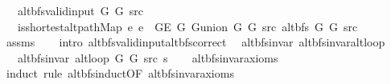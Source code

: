 \begin{isabellebody}
\ \ \ {\isachardoublequoteopen}alt{\isacharunderscore}{\kern0pt}bfs{\isacharunderscore}{\kern0pt}valid{\isacharunderscore}{\kern0pt}input{\isacharprime}{\kern0pt}\ G{}\ G{}\ src{\isachardoublequoteclose}\isanewline
\ \ \ {\isachardoublequoteopen}is{\isacharunderscore}{\kern0pt}shortest{\isacharunderscore}{\kern0pt}alt{\isacharunderscore}{\kern0pt}path{\isacharunderscore}{\kern0pt}Map\ {\isacharparenleft}{\kern0pt}{\isasymlambda}e{\isachardot}{\kern0pt}\ e\ {\isasymin}\ G{\isachardot}{\kern0pt}E\ G{}{\isacharparenright}{\kern0pt}\ {\isacharparenleft}{\kern0pt}G{\isachardot}{\kern0pt}union\ G{}\ G{}{\isacharparenright}{\kern0pt}\ src\ {\isacharparenleft}{\kern0pt}alt{\isacharunderscore}{\kern0pt}bfs\ G{}\ G{}\ src{\isacharparenright}{\kern0pt}{\isachardoublequoteclose}\isanewline
%
\isadelimproof
\ \ %
\endisadelimproof
%
\isatagproof
{}\isamarkupfalse%
\ assms\isanewline
\ \ \isamarkupfalse%
\ {\isacharparenleft}{\kern0pt}intro\ alt{\isacharunderscore}{\kern0pt}bfs{\isacharunderscore}{\kern0pt}valid{\isacharunderscore}{\kern0pt}input{\isachardot}{\kern0pt}alt{\isacharunderscore}{\kern0pt}bfs{\isacharunderscore}{\kern0pt}correct{\isacharparenright}{\kern0pt}%
\endisatagproof
{\isafoldproof}%
%
\isadelimproof
\isanewline
%
\endisadelimproof
%
\isadeliminvisible
\isanewline
%
\endisadeliminvisible
%
\isataginvisible
{}\isamarkupfalse%
\ {\isacharparenleft}{\kern0pt}\ alt{\isacharunderscore}{\kern0pt}bfs{\isacharunderscore}{\kern0pt}invar{\isacharparenright}{\kern0pt}\ alt{\isacharunderscore}{\kern0pt}bfs{\isacharunderscore}{\kern0pt}invar{\isacharunderscore}{\kern0pt}alt{\isacharunderscore}{\kern0pt}loop{\isacharcolon}{\kern0pt}\isanewline
\ \ \ {\isachardoublequoteopen}alt{\isacharunderscore}{\kern0pt}bfs{\isacharunderscore}{\kern0pt}invar{\isacharprime}{\kern0pt}{\isacharprime}{\kern0pt}\ {\isacharparenleft}{\kern0pt}alt{\isacharunderscore}{\kern0pt}loop\ G{}\ G{}\ src\ s{\isacharparenright}{\kern0pt}{\isachardoublequoteclose}%
\endisataginvisible
{\isafoldinvisible}%
%
\isadeliminvisible
\isanewline
%
\endisadeliminvisible
%
\isadelimproof
\ \ %
\endisadelimproof
%
\isatagproof
{}\isamarkupfalse%
\ alt{\isacharunderscore}{\kern0pt}bfs{\isacharunderscore}{\kern0pt}invar{\isacharunderscore}{\kern0pt}axioms\isanewline
{}\isamarkupfalse%
\ {\isacharparenleft}{\kern0pt}induct\ rule{\isacharcolon}{\kern0pt}\ alt{\isacharunderscore}{\kern0pt}bfs{\isacharunderscore}{\kern0pt}induct{\isacharbrackleft}{\kern0pt}OF\ alt{\isacharunderscore}{\kern0pt}bfs{\isacharunderscore}{\kern0pt}invar{\isacharunderscore}{\kern0pt}axioms{\isacharbrackright}{\kern0pt}{\isacharparenright}{\kern0pt}\isanewline

\end{isabellebody}
